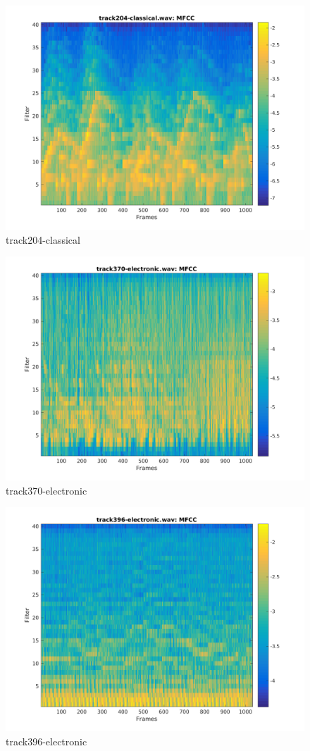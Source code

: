 \documentclass[11pt, a4paper]{article}
\begin{document}
\begin{figure}[H]
    \centering
    \includegraphics[width=.8\textwidth]{track204-classical-mfcc.png}
    \caption{track204-classical}
\end{figure}


\begin{figure}[H]
    \centering
    \includegraphics[width=.8\textwidth]{track370-electronic-mfcc.png}
    \caption{track370-electronic}
\end{figure}


\begin{figure}[H]
    \centering
    \includegraphics[width=.8\textwidth]{track396-electronic-mfcc.png}
    \caption{track396-electronic}
\end{figure}
\end{document}
